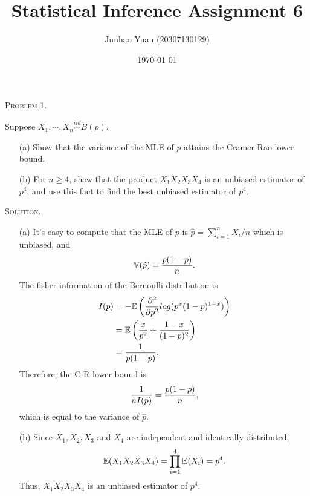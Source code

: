 \documentclass{article}
\title{\textbf{Statistical Inference Assignment 6}}
\author{Junhao Yuan (20307130129)}
\date{\today}
\begin{document}
\begin{CJK}{UTF8}{gbsn}

    \maketitle
    \def \RR{{\mathbb R}}
    \def \EE{{\mathbb E}}
    \def \VV{{\mathbb V}}
    \def \II{{\mathbb I}}


    \begin{shaded}
        \noindent\textsc{Problem 1.}\par
        Suppose $X_1, \cdots, X_n \mathop{\sim}\limits^{iid} B(p)$.
        \begin{itemize}
            \item [(a)] Show that the variance of the MLE of $p$ attains the Cramer-Rao lower bound.
            \item [(b)] For $n\geq 4$, show that the product $X_1X_2X_3X_4$ is an unbiased estimator of
                  $p^4$, and use this fact to find the best unbiased estimator of $p^4$.
        \end{itemize}
    \end{shaded}
    \noindent\textsc{Solution.}\par
    \begin{itemize}
        \item [(a)] It's easy to compute that the MLE of $p$ is $\hat{p} = \sum_{i=1}^n X_i /n$ which is unbiased, and
              \begin{align}
                  \VV(\hat{p}) = \frac{p(1-p)}{n}.\notag
              \end{align}
              The fisher information of the Bernoulli distribution is
              \begin{align}
                  I(p) & = - \EE \left (\frac{\partial^2 }{\partial p^2} log (p^x(1-p)^{1-x}) \right ) \notag \\
                       & = \EE \left (\frac{x}{p^2} + \frac{1 -x}{(1-p)^2} \right )\notag                     \\
                       & = \frac{1}{p(1-p)}.\notag
              \end{align}
              Therefore, the C-R lower bound is
              \begin{align}
                  \frac{1}{n I(p)} = \frac{p(1-p)}{n},\notag
              \end{align}
              which is equal to the variance of $\hat{p}$.
        \item [(b)] Since $X_1, X_2, X_3$ and $X_4$ are independent and identically distributed,
              \begin{align}
                  \EE(X_1X_2X_3X_4) = \prod_{i=1}^4 \EE(X_i) = p^4.\notag
              \end{align}
              Thus, $X_1X_2X_3X_4$ is an unbiased estimator of $p^4$.


\end{itemize}
\end{CJK}
\end{document}
